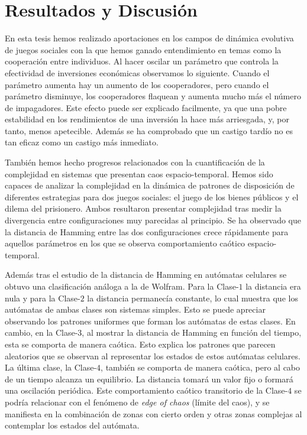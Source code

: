\section{Resultados y Discusión}

En esta tesis hemos realizado aportaciones en los campos de dinámica evolutiva de juegos sociales con la que hemos ganado entendimiento en temas como la cooperación entre individuos. Al hacer oscilar un parámetro que controla la efectividad de inversiones económicas observamos lo siguiente. Cuando el parámetro aumenta hay un aumento de los cooperadores, pero cuando el parámetro disminuye, los cooperadores flaquean y aumenta mucho más el número de impagadores. Este efecto puede ser explicado facilmente, ya que una pobre estabilidad en los rendimientos de una inversión la hace más arriesgada, y, por tanto, menos apetecible. Además se ha comprobado que un castigo tardío no es tan eficaz como un castigo más inmediato.

También hemos hecho progresos relacionados con la cuantificación de la complejidad en sistemas que presentan caos espacio-temporal. Hemos sido capaces de analizar la complejidad en la dinámica de patrones de disposición de diferentes estrategias para dos juegos sociales: el juego de los bienes públicos y el dilema del prisionero. Ambos resultaron presentar complejidad tras medir la divergencia entre configuraciones muy parecidas al principio. Se ha observado que la distancia de Hamming entre las dos configuraciones crece rápidamente para aquellos parámetros en los que se observa comportamiento caótico espacio-temporal.

Además tras el estudio de la distancia de Hamming en autómatas celulares se obtuvo una clasificación análoga a la de Wolfram. Para la Clase-$1$ la distancia era nula y para la Clase-$2$ la distancia permanecía constante, lo cual muestra que los autómatas de ambas clases son sistemas simples. Esto se puede apreciar observando los patrones uniformes que forman los autómatas de estas clases. En cambio, en la Clase-$3$, al mostrar la distancia de Hamming en función del tiempo, esta se comporta de manera caótica. Esto explica los patrones que parecen aleatorios que se observan al representar los estados de estos autómatas celulares. La última clase, la Clase-$4$, también se comporta de manera caótica, pero al cabo de un tiempo alcanza un equilibrio. La distancia tomará un valor fijo o formará una oscilación periódica. Este comportamiento caótico transitorio de la Clase-$4$ se podría relacionar con el fenómeno de \textit{edge of chaos} (límite del caos), y se manifiesta en la combinación de zonas con cierto orden y otras zonas complejas al contemplar los estados del autómata.

